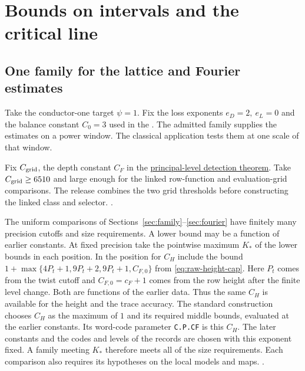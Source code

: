 \section{Bounds on intervals and the critical line}
\label{sec:zeros}

\subsection{One family for the lattice and Fourier estimates}
\label{sec:assembly}

Take the conductor-one target \(\psi=1\). Fix the loss exponents
\(e_D=2,\ e_L=0\) and the balance constant \(C_0=3\) used in the
.
The admitted family supplies the estimates on a power window.
The classical application tests them at one scale of that window.

%
Fix \(C_{\rm grid}\), the depth constant \(C_F\) in the
\hyperlink{candidate.fixed-level-period}{principal-level detection theorem}.
Take \(C_{\rm grid}\ge6510\) and large enough for the linked row-function
and evaluation-grid comparisons. The release combines the two grid
thresholds before constructing the linked class and selector.
.

The uniform comparisons of Sections~\ref{sec:family}--\ref{sec:fourier}
have finitely many precision cutoffs and size requirements. A lower
bound may be a function of earlier constants. At fixed precision take
the pointwise maximum \(K_*\) of the lower bounds in each position.
In the position for \(C_H\) include the bound
\(1+\max\{4P_t+1,9P_t+2,9P_t+1,C_{F,0}\}\)
from \eqref{eq:raw-height-cap}. Here \(P_t\) comes from the twist
cutoff and \(C_{F,0}=c_F+1\) comes from the row height after
the finite level change. Both are functions of the earlier data.
Thus the same \(C_H\) is available for the height and the trace
accuracy. The standard construction chooses \(C_H\) as the maximum
of \(1\) and its required middle bounds, evaluated at the earlier
constants. Its word-code parameter \texttt{C.P.CF} is this \(C_H\).
The later constants and the codes and levels of the records are chosen
with this exponent fixed.
A family meeting \(K_*\) therefore meets all of the size
requirements. Each comparison also requires its hypotheses on the
local models and maps.
.

